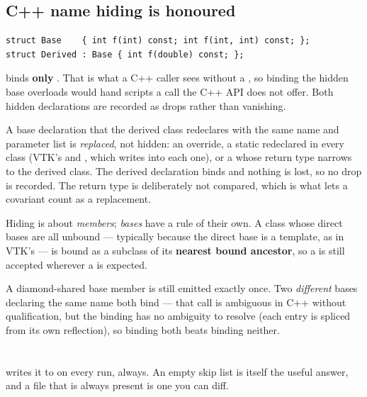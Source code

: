 \subsection{C++ name hiding is honoured}

\begin{lstlisting}[style=cpp]
struct Base    { int f(int) const; int f(int, int) const; };
struct Derived : Base { int f(double) const; };
\end{lstlisting}

 binds \textbf{only} . That is what a C++ caller
sees without a , so binding the hidden base overloads would
hand scripts a call the C++ API does not offer. Both hidden declarations are
recorded as  drops rather than vanishing.

A base declaration that the derived class redeclares with the same name and
parameter list is \emph{replaced}, not hidden: an override, a static redeclared
in every class (VTK's  and , which 
writes into each one), or a  whose return type narrows to the
derived class. The derived declaration binds and nothing is lost, so no drop is
recorded. The return type is deliberately not compared, which is what lets a
covariant  count as a replacement.

Hiding is about \emph{members}; \emph{bases} have a rule of their own. A class
whose direct bases are all unbound --- typically because the direct base is a
template, as in VTK's
--- is bound as a subclass of its \textbf{nearest bound ancestor}, so a
 is still accepted wherever a  is
expected.

A diamond-shared base member is still emitted exactly once. Two \emph{different}
bases declaring the same name both bind --- that call is ambiguous in C++
without qualification, but the binding has no ambiguity to resolve (each entry is
spliced from its own reflection), so binding both beats binding neither.

\section{}

 writes it to  on every run,
always. An empty skip list is itself the useful answer, and a file that is
always present is one you can diff.

